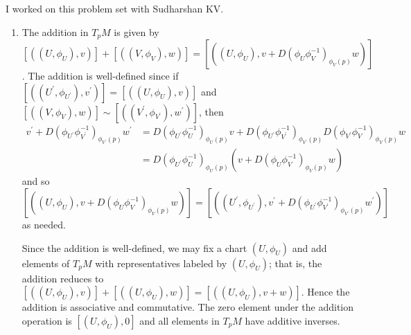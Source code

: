 \documentclass[11pt,leqno]{article}
\theoremstyle{plain}
\theoremstyle{definition}
\numberwithin{equation}{section}
\numberwithin{lem}{section}
\begin{document}
I worked on this problem set with Sudharshan KV.
\begin{enumerate}
    \item The addition in $T_pM$ is given by $[((U,\phi_U),v)] + [((V,\phi_V),w)] = [((U,\phi_U),v+D(\phi_U\phi_V^{-1})_{\phi_V(p)}w)]$. The addition is well-defined since if $[((U^\prime,\phi_{U^\prime}),v^\prime)] = [((U,\phi_U),v)] $ and $ [((V,\phi_V),w)] \sim [((V^\prime,\phi_{V^\prime}),w^\prime)]$, then 
    \begin{align*}
      v^\prime + D(\phi_{U^\prime}\phi_{V^\prime}^{-1})_{\phi_{V^\prime}(p)}w^\prime &= D(\phi_{U^\prime}\phi_U^{-1})_{\phi_U(p)}v + D(\phi_{U^\prime}\phi_{V^\prime}^{-1})_{\phi_{V^\prime}(p)}D(\phi_{V^\prime}\phi_V^{-1})_{\phi_V(p)}w\\
      &= D(\phi_{U^\prime}\phi_U^{-1})_{\phi_U(p)}(v + D(\phi_U\phi_V^{-1})_{\phi_V(p)}w)
    \end{align*}
    and so $[((U,\phi_U),v + D(\phi_U\phi_V^{-1})_{\phi_V(p)}w)] = [((U^\prime,\phi_{U^\prime}),v^\prime + D(\phi_{U^\prime}\phi_{V^\prime}^{-1})_{\phi_{V^\prime}(p)}w^\prime)]$ as needed.

    Since the addition is well-defined, we may fix a chart $(U,\phi_U)$ and add elements of $T_pM$ with representatives labeled by $(U,\phi_U)$; that is, the addition reduces to $[((U,\phi_U),v)] + [((U,\phi_U),w)] = [((U,\phi_U),v+w)]$. Hence the addition is associative and commutative. The zero element under the addition operation is $[(U,\phi_U),0]$ and all elements in $T_pM$ have additive inverses.


\end{enumerate}
\end{document}
